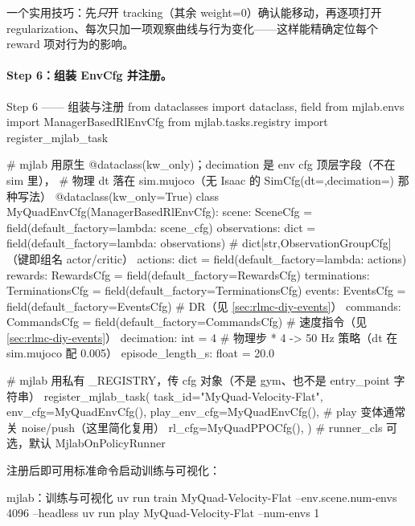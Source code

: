 一个实用技巧：先\emph{只}开 tracking（其余 weight=0）确认能移动，再逐项打开 regularization、每次只加一项观察曲线与行为变化——这样能精确定位每个 reward 项对行为的影响。

\paragraph{Step 6：组装 EnvCfg 并注册。}

\begin{codebox}[Python]{Step 6 —— 组装与注册}
from dataclasses import dataclass, field
from mjlab.envs import ManagerBasedRlEnvCfg
from mjlab.tasks.registry import register_mjlab_task

# mjlab 用原生 @dataclass(kw_only)；decimation 是 env cfg 顶层字段（不在 sim 里），
# 物理 dt 落在 sim.mujoco（无 Isaac 的 SimCfg(dt=,decimation=) 那种写法）
@dataclass(kw_only=True)
class MyQuadEnvCfg(ManagerBasedRlEnvCfg):
    scene:        SceneCfg          = field(default_factory=lambda: scene_cfg)
    observations: dict              = field(default_factory=lambda: observations)  # dict[str,ObservationGroupCfg]（键即组名 actor/critic）
    actions:      dict              = field(default_factory=lambda: actions)
    rewards:      RewardsCfg        = field(default_factory=RewardsCfg)
    terminations: TerminationsCfg   = field(default_factory=TerminationsCfg)
    events:       EventsCfg         = field(default_factory=EventsCfg)   # DR（见 \cref{sec:rlmc-diy-events}）
    commands:     CommandsCfg       = field(default_factory=CommandsCfg) # 速度指令（见 \cref{sec:rlmc-diy-events}）
    decimation:        int   = 4           # 物理步 * 4 -> 50 Hz 策略（dt 在 sim.mujoco 配 0.005）
    episode_length_s:  float = 20.0

# mjlab 用私有 _REGISTRY，传 cfg 对象（不是 gym、也不是 entry_point 字符串）
register_mjlab_task(
    task_id="MyQuad-Velocity-Flat",
    env_cfg=MyQuadEnvCfg(),
    play_env_cfg=MyQuadEnvCfg(),       # play 变体通常关 noise/push（这里简化复用）
    rl_cfg=MyQuadPPOCfg(),
)   # runner_cls 可选，默认 MjlabOnPolicyRunner
\end{codebox}

注册后即可用标准命令启动训练与可视化：

\begin{codebox}[bash]{mjlab：训练与可视化}
uv run train MyQuad-Velocity-Flat --env.scene.num-envs 4096 --headless
uv run play  MyQuad-Velocity-Flat --num-envs 1
\end{codebox}

